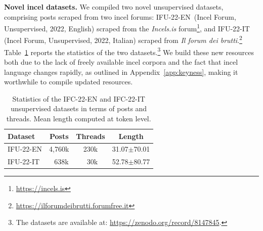 \documentclass[11pt]{article}
\newcommand{\dsENcorpus}{IFU-22-EN}
\newcommand{\dsITcorpus}{IFU-22-IT}
\begin{document}
\vspace*{1mm}\noindent\textbf{Novel incel datasets.} We compiled two novel unsupervised datasets, comprising posts scraped from two incel forums: \dsENcorpus\, (Incel Forum, Unsupervised, 2022, English) scraped from the \textit{Incels.is} forum\footnote{\url{https://incels.is}}, and \dsITcorpus\, (Incel Forum, Unsupervised, 2022, Italian) scraped from \textit{Il forum dei brutti}.\footnote{\url{https://ilforumdeibrutti.forumfree.it}}
Table~\ref{tab:english-italian-unsupervised-datasets-stats} reports the statistics of the two datasets.\footnote{The datasets are available at: \url{https://zenodo.org/record/8147845}.} We build these new resources both due to the lack of freely available incel corpora and the fact that incel language changes rapidly, as outlined in Appendix~\ref{app:keyness}, making it worthwhile to compile updated resources.

\renewcommand{\arraystretch}{0.9}

\begin{table}[t]
  \centering
  \caption{Statistics of the IFC-22-EN and IFC-22-IT unsupervised datasets in terms of posts and threads. Mean length computed at token level.}
  \begin{tabular}{l|ccc}
      \hline
      \textbf{Dataset} & \textbf{Posts} & \textbf{Threads} & \textbf{Length} \\
      \hline
      \dsENcorpus & 4,760k & 230k & 31.07$\pm$70.01 \\
      \dsITcorpus & \,\,\,\,638k & \,\,\,30k & 52.78$\pm$80.77 \\
      \hline
  \end{tabular}
  \label{tab:english-italian-unsupervised-datasets-stats}
\end{table}
\end{document}
